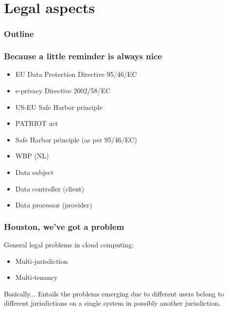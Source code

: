 \documentclass{beamer}
\begin{document}
\section{Legal aspects}

\begin{frame}
  \frametitle{Outline}
\end{frame}

\begin{frame}
    \frametitle{Because a little reminder is always nice}
    \begin{itemize}
        \item EU Data Protection Directive 95/46/EC
        \item e-privacy Directive 2002/58/EC %
        \item US-EU Safe Harbor principle
        \item PATRIOT act
        \item Safe Harbor principle (as per 95/46/EC)
        \item WBP (NL)
    \end{itemize}

    \begin{itemize}
        \item Data subject
        \item Data controller (client) %
        \item Data processor (provider) %
    \end{itemize}
\end{frame}

\begin{frame}
    \frametitle{Houston, we've got a problem}
    General legal problems in cloud computing:
    \begin{itemize}
        \item Multi-jurisdiction
        \item Multi-tenancy
    \end{itemize}

    \begin{block}{Basically...}
        Entails the problems emerging due to different users belong to
        different jurisdictions on a single system in possibly another
        jurisdiction.
    \end{block}
\end{frame}
\end{document}
